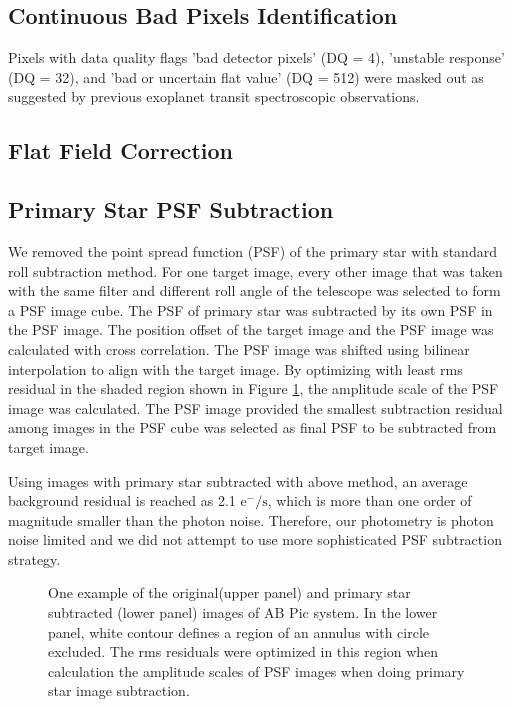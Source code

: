 \documentclass[apj]{emulateapj}
\newcommand{\eps}{$\mathrm{e}^{-}/\mathrm{s}$}
\begin{document}
\subsection{Continuous Bad Pixels Identification}
Pixels with data quality flags 'bad detector pixels' (DQ = 4),
'unstable response' (DQ = 32), and 'bad or uncertain flat value' (DQ =
512) were masked out as suggested by previous exoplanet transit
spectroscopic observations\citep[e.g.][]{Berta2012, Kreidberg2014}.

\subsection{Flat Field Correction}
\subsection{Primary Star PSF Subtraction}
We removed the point spread function (PSF) of the primary star with
standard roll subtraction method. For one target image, every other
image that was taken with the same filter and different roll angle of
the telescope was selected to form a PSF image cube. The PSF of
primary star was subtracted by its own PSF in the PSF image.  The
position offset of the target image and the PSF image was calculated
with cross correlation. The PSF image was shifted using bilinear
interpolation to align with the target image. By optimizing with least
rms residual in the shaded region shown in Figure \ref{fig:image}, the
amplitude scale of the PSF image was calculated. The PSF image
provided the smallest subtraction residual among images in the PSF
cube was selected as final PSF to be subtracted from target image.

Using images with primary star subtracted with above method, an
average background residual is reached as 2.1 \eps, which is more than
one order of magnitude smaller than the photon noise. Therefore, our
photometry is photon noise limited and we did not attempt to use
more sophisticated PSF subtraction strategy.

\begin{figure}
  \centering
  \caption{One example of the original(upper panel) and primary star
    subtracted (lower panel) images of AB Pic system. In the lower
    panel, white contour defines a region of an annulus with circle
    excluded. The rms residuals were optimized in this region when
    calculation the amplitude scales of PSF images when doing primary
    star image subtraction.}
  \label{fig:image}
\end{figure}
\end{document}
